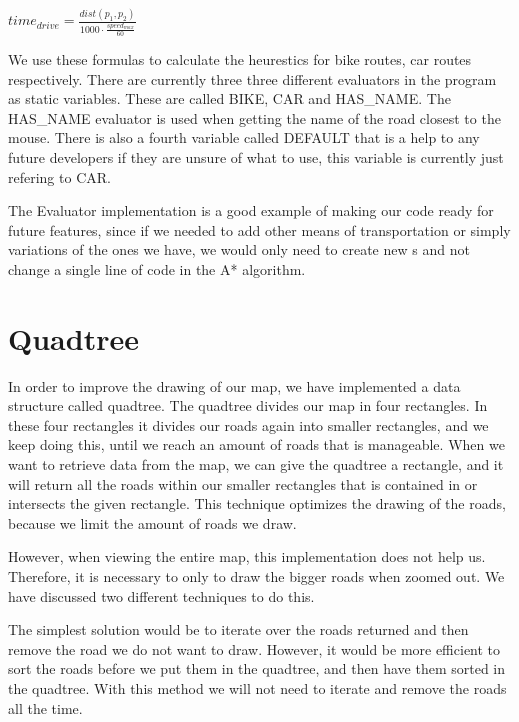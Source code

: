 \begin{center}
$
time_{drive}=\frac{dist(p_{1},p_{2})}{1000\cdot \frac {speed_{max}}{60}}
$
\end{center}

We use these formulas to calculate the heurestics for bike routes, car routes respectively.
There are currently three three different evaluators in the program as static variables. These
are called BIKE, CAR and HAS\_NAME. The HAS\_NAME evaluator is used when getting
the name of the road closest to the mouse. There is also a fourth variable called DEFAULT that is a help to
any future developers if they are unsure of what to use, this variable is currently just refering
to CAR. 

The Evaluator implementation is a good example of making our code ready for future features, 
since if we needed to add other means of transportation or simply variations of the ones 
we have, we would only need to create new s and not change 
a single line of code in the A* algorithm.

\section{Quadtree}
\label{IMPL-QT}
In order to improve the drawing of our map, we have implemented a data structure
called quadtree. The quadtree divides our map in four rectangles. In these four rectangles 
it divides our roads again into smaller rectangles, and we keep doing this, until we reach
an amount of roads that is manageable.
When we want to retrieve data from the map, we can give the quadtree a
rectangle, and it will return all the roads within our smaller rectangles that is contained in 
or intersects the given rectangle. This technique optimizes the drawing of the roads, because we
limit the amount of roads we draw.

However, when viewing the entire map, this implementation does not help
us. Therefore, it is necessary to only to draw the bigger roads when zoomed out. We
have discussed two different techniques to do this.

The simplest solution would be to iterate over the roads returned and then
remove the road we do not want to draw. However, it would be more efficient to sort the
roads before we put them in the quadtree, and then have them sorted in the quadtree.
With this method we will not need to iterate and remove the roads all the time.

